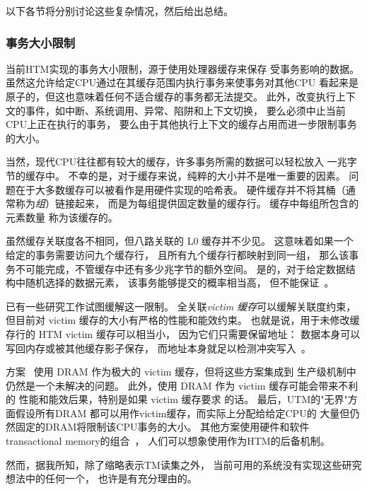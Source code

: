 以下各节将分别讨论这些复杂情况，然后给出总结。

\subsubsection{事务大小限制}
\label{sec:future:Transaction-Size Limitations}

当前HTM实现的事务大小限制，源于使用处理器缓存来保存
受事务影响的数据。
虽然这允许给定CPU通过在其缓存范围内执行事务来使事务对其他CPU
看起来是原子的，但这也意味着任何不适合缓存的事务都无法提交。
此外，改变执行上下文的事件，如中断、系统调用、异常、陷阱和上下文切换，
要么必须中止当前CPU上正在执行的事务，
要么由于其他执行上下文的缓存占用而进一步限制事务的大小。

当然，现代CPU往往都有较大的缓存，许多事务所需的数据可以轻松放入
一兆字节的缓存中。
不幸的是，对于缓存来说，纯粹的大小并不是唯一重要的因素。
问题在于大多数缓存可以被看作是用硬件实现的哈希表。
硬件缓存并不将其桶（通常称为\emph{组}）链接起来，
而是为每组提供固定数量的缓存行。
缓存中每组所包含的元素数量
称为该缓存的\emph{}。

虽然缓存关联度各不相同，但八路关联的 L0 缓存并不少见。
这意味着如果一个给定的事务需要访问九个缓存行，
且所有九个缓存行都映射到同一组，
那么该事务不可能完成，不管缓存中还有多少兆字节的额外空间。
是的，对于给定数据结构中随机选择的数据元素，
该事务能够提交的概率相当高，
但不能保证~\cite{PaulEMcKenney2012HTMCacheGeometry}。

已有一些研究工作试图缓解这一限制。
全关联\emph{victim 缓存}可以缓解关联度约束，
但目前对 victim 缓存的大小有严格的性能和能效约束。
也就是说，用于未修改缓存行的 HTM victim 缓存可以相当小，
因为它们只需要保留地址：
数据本身可以写回内存或被其他缓存影子保存，
而地址本身就足以检测冲突写入~\cite{RaviRajwar2012TSX}。

方案~\cite{CScottAnanian2006,KevinEMoore2006}
使用 DRAM 作为极大的 victim 缓存，但将这些方案集成到
生产级机制中
仍然是一个未解决的问题。
此外，使用 DRAM 作为 victim 缓存可能会带来不利的
性能和能效后果，特别是如果 victim 缓存要求
的话。
最后，UTM的"无界"方面假设所有DRAM
都可以用作victim缓存，而实际上分配给给定CPU的
大量但仍然固定的DRAM将限制该CPU事务的大小。
其他方案使用硬件和软件transactional memory的组合~\cite{SanjeevKumar2006}，
人们可以想象使用作为HTM的后备机制。

然而，据我所知，除了缩略表示TM读集之外，
当前可用的系统没有实现这些研究想法中的任何一个，
也许是有充分理由的。

